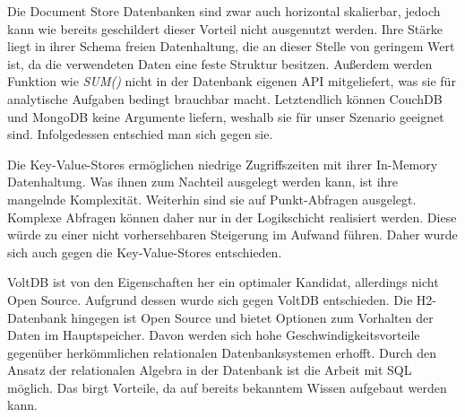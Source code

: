 Die Document Store Datenbanken sind zwar auch horizontal skalierbar, jedoch kann wie bereits geschildert dieser Vorteil nicht ausgenutzt werden. Ihre Stärke liegt in ihrer Schema freien Datenhaltung, die an dieser Stelle von geringem Wert ist, da die verwendeten Daten eine feste Struktur besitzen. Außerdem werden Funktion wie \textit{SUM()} nicht in der Datenbank eigenen API mitgeliefert, was sie für analytische Aufgaben bedingt brauchbar macht. Letztendlich können CouchDB und MongoDB keine Argumente liefern, weshalb sie für unser Szenario geeignet sind. Infolgedessen entschied man sich gegen sie.

Die Key-Value-Stores ermöglichen niedrige Zugriffszeiten mit ihrer In-Memory Datenhaltung. Was ihnen zum Nachteil ausgelegt werden kann, ist ihre mangelnde Komplexität. Weiterhin sind sie auf Punkt-Abfragen ausgelegt. Komplexe Abfragen können daher nur in der Logikschicht realisiert werden. Diese würde zu einer nicht vorhersehbaren Steigerung im Aufwand führen. Daher wurde sich auch gegen die Key-Value-Stores entschieden. 

VoltDB ist von den Eigenschaften her ein optimaler Kandidat, allerdings nicht Open Source. Aufgrund dessen wurde sich gegen VoltDB entschieden. Die H2-Datenbank hingegen ist Open Source und bietet Optionen zum 
Vorhalten der Daten im Hauptspeicher. Davon werden sich hohe Geschwindigkeitsvorteile gegenüber herkömmlichen relationalen Datenbanksystemen erhofft. Durch den Ansatz der relationalen Algebra in der Datenbank ist die Arbeit mit SQL möglich. Das birgt Vorteile, da auf bereits bekanntem Wissen aufgebaut werden kann.